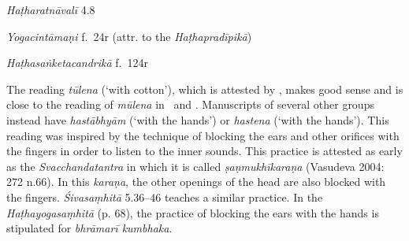 \begin{ekdosis}

\begin{testimonia}[hp04_038]
\emph{Haṭharatnāvalī} 4.8
\begin{versinnote}
\end{versinnote}

\emph{Yogacintāmaṇi} f.~24r (attr. to the \emph{Haṭhapradīpikā})
\begin{versinnote}
\end{versinnote}

\emph{Haṭhasaṅketacandrikā} f.~124r
\begin{versinnote}
\end{versinnote}
\end{testimonia}

\begin{philcomm}[hp04_038]
%

The reading \emph{tūlena} (`with cotton'), which is attested by \alphaThree, makes good sense and is close to the reading of \emph{mūlena} in \alphaOne\ and \alphaTwo. Manuscripts of several other groups instead have \emph{hastābhyām} (`with the hands') or \emph{hastena} (`with the hands'). This reading was inspired by the technique of blocking the ears and other orifices with the fingers in order to listen to the inner sounds. This practice is attested as early as the \textit{Svacchandatantra} in which it is called \textit{ṣaṇmukhīkaraṇa} (Vasudeva 2004: 272 n.66). In this \emph{karaṇa}, the other openings of the head are also blocked with the fingers. \emph{Śivasaṃhitā} 5.36–46 teaches a similar practice. In the \textit{Haṭhayogasaṃhitā} (p. 68), the practice of blocking the ears with the hands is stipulated for \textit{bhrāmarī kumbhaka}.
\end{philcomm}


\end{ekdosis}
